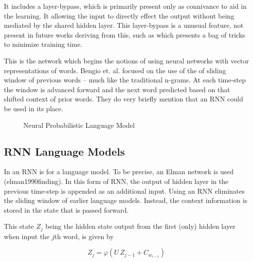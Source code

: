 \documentclass[parskip]{komatufte}
\begin{document}
It includes a layer-bypass, which is primarily present only as connivance to aid in the learning.
It allowing the input to directly effect the output without being mediated by the shared hidden layer.
This layer-bypass is a unusual feature, not present in future works deriving from this, such as  which presents a bag of tricks to minimize training time. 





This is the network which begins the notions of using neural networks with vector representations of words.
Bengio et. al. focused on the use of the of sliding window of previous words -- much like the traditional n-grams.
At each time-step the window is advanced forward and the next word predicted based on that shifted context of prior words.
They do very briefly mention that an RNN could be used in its place.

\begin{figure}
	\centering
	 
	\caption{\label{fig:neural-language-model} Neural Probabilistic Language Model}
\end{figure}


\subsection{RNN Language Models}


In  an RNN is for a language model.
To be precise, an Elman network is used \tcite(elman1990finding).
In this form of RNN, the output of hidden layer in the previous time-step is appended as an additional input.
Using an RNN eliminates the sliding window of earlier language models.
Instead, the context information is stored in the state that is passed forward.

This state $Z_{j}$ being the hidden state output from the first (only) hidden layer when input the $j$th word, 
is given by 

\begin{equation}
	Z_{j} = \varphi\left( U\,Z_{j-1} + C_{w_{i-1}} \right)
\end{equation}
\end{document}
